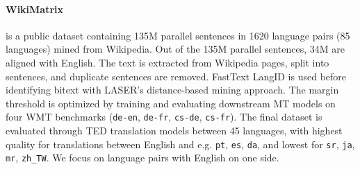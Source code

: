 \paragraph{WikiMatrix~\citep{schwenk-etal-2021-wikimatrix}}is a public dataset containing 135M parallel sentences in 1620 language pairs (85 languages) mined from Wikipedia. Out of the 135M parallel sentences, 34M are aligned with English.
The text is extracted from Wikipedia pages, split into sentences, and duplicate sentences are removed. FastText LangID is used before identifying bitext with LASER's distance-based mining approach.
The margin threshold is optimized by training and evaluating downstream MT models on four WMT benchmarks (\texttt{de-en}, \texttt{de-fr}, \texttt{cs-de}, \texttt{cs-fr}). The final dataset is evaluated through TED translation models between 45 languages, with highest quality for translations between English and e.g. \texttt{pt}, \texttt{es}, \texttt{da}, and lowest for \texttt{sr}, \texttt{ja}, \texttt{mr}, \texttt{zh\_TW}.
We focus on language pairs with English on one side.




